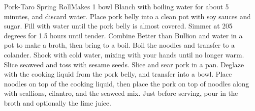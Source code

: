 \documentclass[]{article}
\title{}
\author{}
\begin{document}
\begin{recipe}{Pork-Taro Spring Roll}{}{Makes 1 bowl}
	Blanch with boiling water for about 5 minutes, and discard water. 
	Place pork belly into a clean pot with soy sauces and sugar. Fill with water until the pork belly is almost covered. Simmer at 205 degrees for 1.5 hours until tender. 
	Combine Better than Bullion and water in a pot to make a broth, then bring to a boil. 
	Boil the noodles and transfer to a colander. Shock with cold water, mixing with your hands until no longer warm.
	Slice seaweed and toss with sesame seeds.
	Slice and sear pork in a pan. Deglaze with the cooking liquid from the pork belly, and transfer into a bowl.
	Place noodles on top of the cooking liquid, then place the pork on top of noodles along with scallions, cilantro, and the seaweed mix. Just before serving, pour in the broth and optionally the lime juice. 
\end{recipe}
\end{document}
